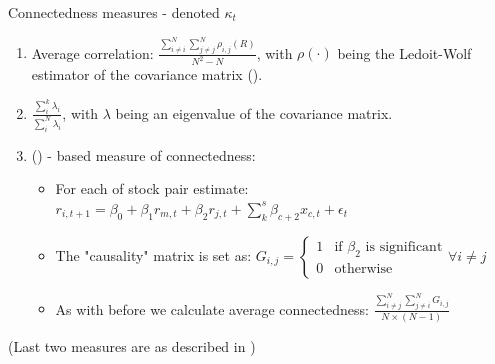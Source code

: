 \documentclass{beamer}
\begin{document}
\begin{frame}{Connectedness measures - denoted $\kappa_t$}

\begin{enumerate}
    \item<1-> Average correlation: $\frac{\sum_{i \neq i}^{N} \sum_{j \neq j}^{N} \rho_{i,j}(R)}{N^2-N}$,  with $\rho(\cdot)$ being the Ledoit-Wolf estimator of the covariance matrix (\cite{ledoit}).
    \item<2-> $\frac{\sum_{i}^{k} \lambda_i}{\sum_{i}^{N} \lambda_i}$, with $\lambda$ being an eigenvalue of the covariance matrix. 
    \item<3-> (\cite{granger}) - based measure of connectedness:
    \begin{itemize}
        \item<4-> For each of stock pair estimate: $r_{i,t+1} = \beta_0 + \beta_1 r_{m, t} + \beta_2 r_{j, t} + \sum_{k}^{s} \beta_{c+2} x_{c, t} + \epsilon_t$
        \item<5-> The "causality" matrix is set as: $G_{i,j} = \begin{cases}
            1  & \text{if } \beta_2 \text{ is significant} \\
            0 & \text{otherwise}
          \end{cases} \forall i \neq j$
        \item<6-> As with before we calculate average connectedness: $\frac{\sum_{i \neq j}^{N} \sum_{j \neq i}^{N} G_{i,j}}{ N \times (N-1)}$
    \end{itemize}
\end{enumerate}
    (Last two measures are as described in \cite{billio})
\end{frame}
\end{document}
